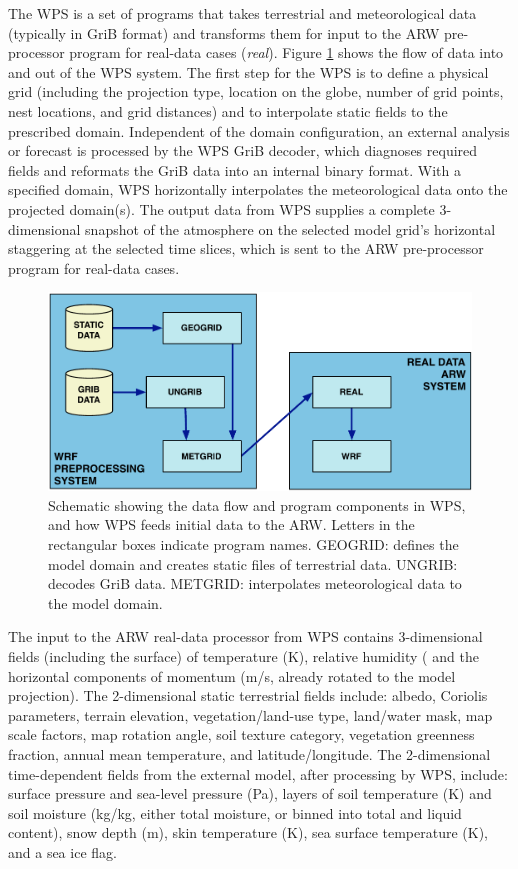 The WPS is a set of programs that takes
terrestrial and meteorological data (typically in GriB format) and transforms them for input to
the ARW pre-processor program for real-data cases ({\it real}).
Figure \ref {figure:WPS_real_wrf} shows the flow of data into and out of the WPS system.  
The first step for the WPS is to define a physical grid (including
the projection type, location on the globe, 
number of grid points, nest locations, and grid distances) and
to interpolate static fields to the prescribed domain.
Independent of the domain configuration,
an external analysis or forecast is processed by the WPS GriB decoder,
which diagnoses required fields and
reformats the GriB data into an internal binary format.
With a specified domain,
WPS horizontally interpolates the meteorological data onto the projected domain(s). 
The output data from WPS supplies a complete 3-dimensional snapshot of the atmosphere
on the selected model grid's horizontal staggering at the selected time slices,
which is sent to the ARW pre-processor program for real-data cases.

%
%
\begin{figure}
  \centering
  \includegraphics[width=6in]{figures/WPS_real_wrf.pdf}
  \caption{\label{figure:WPS_real_wrf}Schematic showing 
the data flow and program components in WPS, and how WPS feeds initial data to the ARW.
Letters in the rectangular boxes indicate program names.
GEOGRID: defines the model domain and creates static files of terrestrial data.  UNGRIB:
decodes GriB data. METGRID: interpolates meteorological data to the model domain.}
\end{figure}

The input to the ARW real-data processor from 
WPS contains 3-dimensional fields (including
the surface) of temperature (K), relative humidity
(%
and the horizontal components of momentum (m/s, already rotated to the model 
projection).  
The 2-dimensional static terrestrial fields include:
albedo, Coriolis parameters, terrain elevation, vegetation/land-use type, 
land/water mask, map scale factors, map rotation angle, soil texture category, vegetation greenness fraction, 
annual mean temperature, 
and latitude/longitude.  
The 2-dimensional time-dependent fields from the external model, after processing by WPS, include: 
surface pressure and sea-level pressure (Pa), layers of soil temperature (K) and  soil moisture (kg/kg, 
either total moisture, or 
binned into total and liquid content), 
snow depth (m), skin temperature (K), sea surface temperature (K), and a sea ice flag.  

